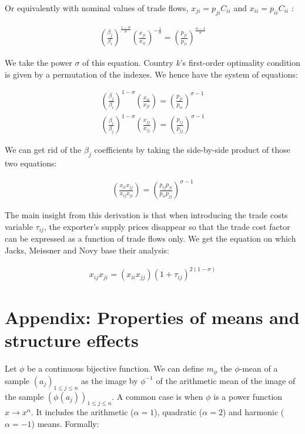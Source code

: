 \documentclass{article}
\begin{document}
Or equivalently with nominal values of trade flows,
$x_{ji}=p_{ji}C_{ii}$ and $x_{ii}=p_{ii}C_{ii}$ :

\begin{eqnarray*}
\left(\frac{\beta_j}{\beta_i}\right)^{\frac{1-\sigma}{\sigma}}\left(\frac{x_{ji}}{x_{ii}}\right)^{-\frac{1}{\sigma}}=\left(\frac{p_{ji}}{p_{ii}}\right)^{\frac{\sigma-1}{\sigma}}
\end{eqnarray*}

We take the power $\sigma$ of this equation. Country $k$'s
first-order optimality condition is given by a permutation of
the indexes. We hence have the system of equations:

\begin{eqnarray*}
\left(\frac{\beta_j}{\beta_i}\right)^{1-\sigma}\left(\frac{x_{ii}}{x_{ji}}\right)=\left(\frac{p_{ji}}{p_{ii}}\right)^{\sigma-1}\\
\left(\frac{\beta_i}{\beta_j}\right)^{1-\sigma}\left(\frac{x_{jj}}{x_{ij}}\right)=\left(\frac{p_{ij}}{p_{jj}}\right)^{\sigma-1}
\end{eqnarray*}

We can get rid of the $\beta_j$ coefficients by taking the
side-by-side product of those two equations:

\begin{eqnarray*}
\left(\frac{x_{ii} x_{jj}}{x_{ij} x_{ji}}\right)=\left(\frac{p_{ij}
p_{ji}}{p_{ii} p_{jj}}\right)^{\sigma-1}
\end{eqnarray*}

The main insight from this derivation is that when introducing
the trade costs variable $\tau_{ij}$, the exporter's supply
prices disappear so that the trade cost factor can be expressed
as a function of trade flows only. We get the equation on which
Jacks, Meissner and Novy base their analysis:

\begin{eqnarray*}
x_{ij} x_{ji} =(x_{ii} x_{jj}) (1+\tau_{ij})^{2(1-\sigma)}
\end{eqnarray*}

\section{\label{A2}Appendix: Properties of means and structure effects}


Let $\phi$ be a continuous bijective function. We can define
$m_{\phi}$ the $\phi$-mean of a sample $(a_j)_{1\leq j\leq n}$
as the image by $\phi^{-1}$ of the arithmetic mean of the image
of the sample $(\phi(a_j))_{1\leq j\leq n}$. A common case is
when $\phi$ is a power function $x \rightarrow x^\alpha$. It
includes the arithmetic ($\alpha=1$), quadratic ($\alpha=2$)
and harmonic ($\alpha=-1$) means. Formally:
\end{document}

